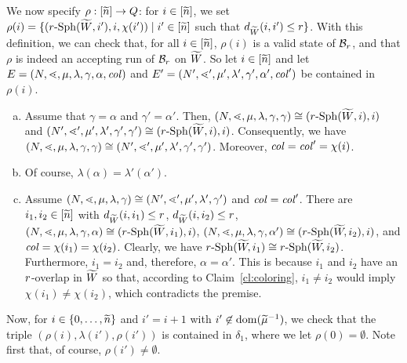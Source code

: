 \documentclass{LMCS}
\begin{document}
We now specify $\rho: [\widetilde{n}] \rightarrow Q$: for $i \in [\widetilde{n}]$, we set $\rho(i)
= \{(r\text{-}\mathrm{Sph}({\widetilde{W}},i'),i,\chi(i')) \mid i' \in [\widetilde{n}]$ such that
$d_{{\widetilde{W}}}(i,i') \le r\}$. With this definition, we can check that, for all $i
\in [\widetilde{n}]$, $\rho(i)$ is a valid state of $\mathcal{B}_r$, and that $\rho$ is
indeed an accepting run of $\mathcal{B}_r$ on ${\widetilde{W}}$.
So let $i \in [\widetilde{n}]$ and let $E=(N,\mathord{\lessdot},\mu,\lambda,\gamma,\alpha,\mathit{col})$
and $E'=(N',\mathord{\lessdot}',\mu',\lambda',\gamma',\alpha',\mathit{col}')$ be contained in
$\rho(i)$.
\begin{enumerate}[(a)]
\item Assume that $\gamma = \alpha$ and $\gamma' = \alpha'$. Then,
  $(N,\mathord{\lessdot},\mu,\lambda,\gamma,\gamma) \cong (r\text{-}\mathrm{Sph}({\widetilde{W}},i),i)$ and
  $(N',\mathord{\lessdot}',\mu',\lambda',\gamma',\gamma') \cong
  (r\text{-}\mathrm{Sph}({\widetilde{W}},i),i)$. Consequently, we have
  $(N,\mathord{\lessdot},\mu,\lambda,\gamma,\gamma) \cong
  (N',\mathord{\lessdot}',\mu',\lambda',\gamma',\gamma')$. Moreover, $\mathit{col} = \mathit{col}' =
  \chi(i)$.
\item Of course, $\lambda(\alpha) = \lambda'(\alpha')$.
\item Assume $(N,\mathord{\lessdot},\mu,\lambda,\gamma) \cong
  (N',\mathord{\lessdot}',\mu',\lambda',\gamma')$ and $\mathit{col} = \mathit{col}'$. There are
  $i_1,i_2 \in [\widetilde{n}]$ with $d_{\widetilde{W}}(i,i_1) \le r$, $d_{\widetilde{W}}(i,i_2) \le
  r$, $(N,\mathord{\lessdot},\mu,\lambda,\gamma,\alpha) \cong
  (r\text{-}\mathrm{Sph}({\widetilde{W}},i_1),i)$, $(N,\mathord{\lessdot},\mu,\lambda,\gamma,\alpha') \cong
  (r\text{-}\mathrm{Sph}({\widetilde{W}}\!,i_2),i)$, and $\mathit{col} = \chi(i_1) = \chi(i_2)$. Clearly,
  we have $r\text{-}\mathrm{Sph}({\widetilde{W}}\!,i_1) \cong r\text{-}\mathrm{Sph}({\widetilde{W}}\!,i_2)$.
  Furthermore, $i_1 = i_2$ and, therefore, $\alpha = \alpha'$. This is because
  $i_1$ and $i_2$ have an $r$-overlap in ${\widetilde{W}}$ so that, according to
  Claim~\ref{cl:coloring}, $i_1 \neq i_2$ would imply $\chi(i_1) \neq
  \chi(i_2)$, which contradicts the premise.
\end{enumerate}



\noindent Now, for $i \in \{0,\ldots,\widetilde{n}\}$ and $i' = i + 1$ with $i' \not\in
\mathrm{dom}(\widetilde{\mu}^{-1})$, we check that the triple $(\rho(i),\lambda(i'),\rho(i'))$ is
contained in $\delta_1$, where we let $\rho(0) = \emptyset$. Note first that,
of course, $\rho(i') \neq \emptyset$.
\end{document}
